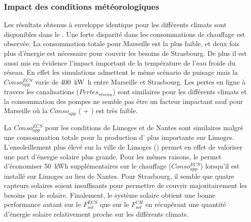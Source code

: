 \subsubsection{Impact des conditions météorologiques} %
\label{ssub:impact_des_conditions_meteorologiques}
Les résultats obtenus à enveloppe identique pour les différents climats sont disponibles dans
le . Une forte disparité dans les consommations
de chauffage est observée. La consommation totale pour Marseille est la plus faible, et deux fois
plus d’énergie est nécessaire pour couvrir les besoins de Strasbourg. De plus il est aussi
mis en évidence l’impact important de la température de l’eau froide du réseau. En effet
les simulations admettent le même scénario de puisage mais la $Conso_{app}^{ECS}$ varie de
\SI{400}{\kilo\watt\hour} entre Marseille et Strasbourg. Les pertes en ligne à travers
les canalisations ($Pertes_{réseau}$) sont similaires pour les différents climats et la
consommation des pompes ne semble pas être un facteur impactant sauf pour Marseille où la
$Conso_{app}$  ( + ) est très faible.

La $Conso_{app}^{ECS}$ pour les conditions de Limoges et de Nantes sont similaires malgré
une consommation totale pour la production d’ plus importante sur Limoges. L’ensoleillement
plus élevé sur la ville de Limoges () permet en effet de
valoriser une part d’énergie solaire plus grande. Pour les mêmes raisons, le 
permet d’économiser \SI{50}{kWh} supplémentaires sur le chauffage ($Conso_{app}^{ECS}$) lorsqu’il
est installé sur Limoges au lieu de Nantes. Pour Strasbourg, il semble que quatre capteurs
solaires soient insuffisants pour permettre de couvrir majoritairement les besoins par le
solaire. Finalement, le système solaire obtient une bonne performance autant sur le
$F_{sol}^{ECS}$ que sur le $F_{sol}^{CH}$ en récupérant une quantité d’énergie solaire
relativement proche sur les différents climats.

